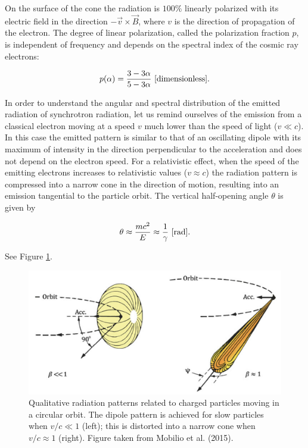\documentclass[a4paper,10pt]{article}
\begin{document}
{\noindent}On the surface of the cone the radiation is $100\%$ linearly polarized with its electric field in the direction $-\vec{v}\times\vec{B}$, where $v$ is the direction of propagation of the electron. The degree of linear polarization, called the polarization fraction $p$, is independent of frequency and depends on the spectral index of the cosmic ray electrons:

\begin{align*}
    p(\alpha) = \frac{3-3\alpha}{5-3\alpha} ~ [{\rm dimensionless}].
\end{align*}

{\noindent}In order to understand the angular and spectral distribution of the emitted radiation of synchrotron radiation, let us remind ourselves of the emission from a classical electron moving at a speed $v$ much lower than the speed of light ($v\ll c$). In this case the emitted pattern is similar to that of an oscillating dipole with its maximum of intensity in the direction perpendicular to the acceleration and does not depend on the electron speed. For a relativistic effect, when the speed of the emitting electrons increases to relativistic values ($v\approx c$) the radiation pattern is compressed into a narrow cone in the direction of motion, resulting into an emission tangential to the particle orbit. The vertical half-opening angle $\theta$ is given by

\begin{align*}
    \theta \approx \frac{mc^2}{E} \approx \frac{1}{\gamma} ~ [{\rm rad}].
\end{align*}

{\noindent}See Figure \ref{fig:synchrotronorbits}.

\begin{figure}[h]
    \centering
    \includegraphics[width=12cm]{figures/SynchrotronOrbits.png}
    \caption{\footnotesize{Qualitative radiation patterns related to charged particles moving in a circular orbit. The dipole pattern is achieved for slow particles when $v/c\ll1$ (left); this is distorted into a narrow cone when $v/c\approx1$ (right). Figure taken from Mobilio et al. (2015).}}
    \label{fig:synchrotronorbits}
\end{figure}
\end{document}
